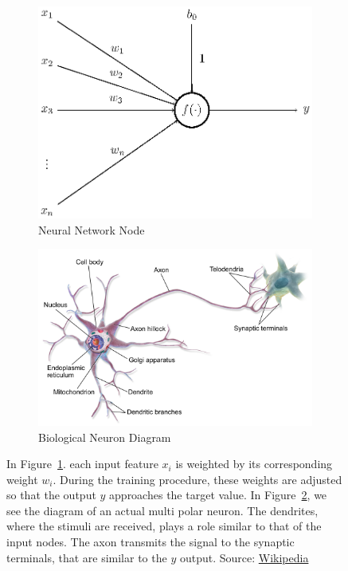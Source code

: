\begin{figure}[H]
	\begin{subfigure}{0.5\linewidth}
		\centering
		\includegraphics[width=0.9\linewidth]{figures/neuron.eps}
		\caption{Neural Network Node}
		\label{fig:modelNeuron_a}
	\end{subfigure}
	\begin{subfigure}{0.5\linewidth}
		\centering
		\includegraphics[width=0.9\linewidth]{figures/MultipolarNeuron.png}
		\caption{Biological Neuron Diagram}
		\label{fig:modelNeuron_b}
	\end{subfigure}
		
    \caption[Representations of a Neuron in an ANN~\ref{fig:modelNeuron_a} and a biological multi polar neuron~\ref{fig:modelNeuron_b}]{In Figure~\ref{fig:modelNeuron_a}. each input feature $x_i$ is weighted by its corresponding weight $w_i$. During the training procedure, these weights are adjusted so that the output $y$ approaches the target value. In Figure~\ref{fig:modelNeuron_b}, we see the diagram of an actual multi polar neuron. The dendrites, where the stimuli are received, plays a role similar to that of the input nodes. The axon transmits the signal to the synaptic terminals, that are similar to the $y$ output. Source: \href{https://en.wikipedia.org/wiki/Neuron\#/media/File:Neuron\_Hand-tuned.sv://en.wikipedia.org/wiki/Neuron\#/media/File:Blausen\_0657\_MultipolarNeuron.png}{Wikipedia}}
	\label{fig:modelNeuron}
\end{figure}


